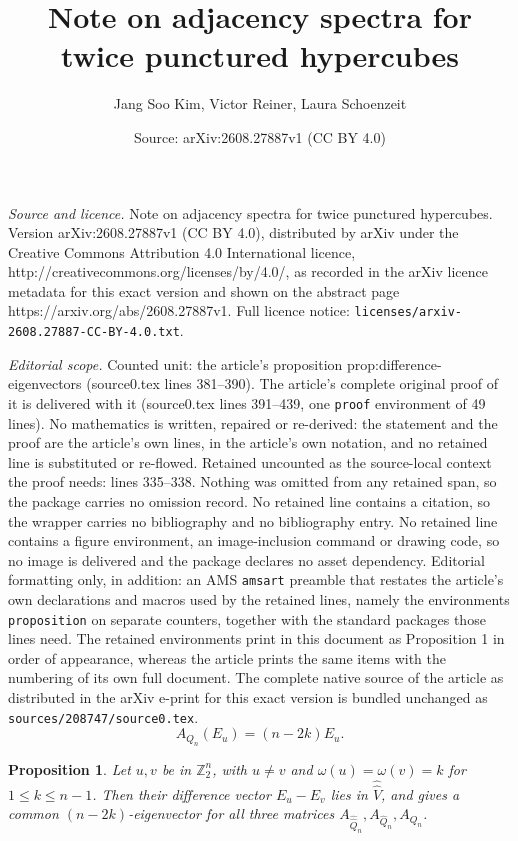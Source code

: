 \documentclass[10pt,a4paper]{amsart}
\title{Note on adjacency spectra for twice punctured hypercubes}
\author{Jang Soo Kim, Victor Reiner, Laura Schoenzeit}
\date{Source: arXiv:2608.27887v1 (CC BY 4.0)}
\newtheorem{proposition}{Proposition}
\newcommand{\ZZ}{\mathbb{Z}}
\begin{document}
\maketitle

\noindent\emph{Source and licence.} Note on adjacency spectra for twice punctured hypercubes. Version arXiv:2608.27887v1 (CC BY 4.0), distributed by arXiv under the Creative Commons Attribution 4.0 International licence, http://creativecommons.org/licenses/by/4.0/, as recorded in the arXiv licence metadata for this exact version and shown on the abstract page https://arxiv.org/abs/2608.27887v1. Full licence notice: \texttt{licenses/arxiv-2608.27887-CC-BY-4.0.txt}.\par\smallskip

\noindent\textit{Editorial scope.} Counted unit: the article's proposition prop:difference-eigenvectors (source0.tex lines 381--390). The article's complete original proof of it is delivered with it (source0.tex lines 391--439, one \texttt{proof} environment of 49 lines). No mathematics is written, repaired or re-derived: the statement and the proof are the article's own lines, in the article's own notation, and no retained line is substituted or re-flowed.  Retained uncounted as the source-local context the proof needs: lines 335--338.  Nothing was omitted from any retained span, so the package carries no omission record.  No retained line contains a citation, so the wrapper carries no bibliography and no bibliography entry.  No retained line contains a figure environment, an image-inclusion command or drawing code, so no image is delivered and the package declares no asset dependency.  Editorial formatting only, in addition: an AMS \texttt{amsart} preamble that restates the article's own declarations and macros used by the retained lines, namely the environments \texttt{proposition} on separate counters, together with the standard packages those lines need.  The retained environments print in this document as Proposition 1 in order of appearance, whereas the article prints the same items with the numbering of its own full document.  The complete native source of the article as distributed in the arXiv e-print for this exact version is bundled unchanged as \texttt{sources/208747/source0.tex}.
\begin{equation}
\label{eqn:eigenvector-equation-for-Eu}
A_{Q_n}(E_u)=(n-2k) E_u.
\end{equation}

\begin{proposition}
\label{prop:difference-eigenvectors}
Let $u,v$ be in $\ZZ_2^n$, 
with $u \neq v$ and $\omega(u)=\omega(v)=k$ for $1 \leq k \leq n-1$.
Then their difference vector $E_u-E_v$
lies in $\hat{\hat{V}}$,
and gives a common $(n-2k)$-eigenvector
for all three matrices $A_{\hat{\hat{Q}}_n}, A_{\hat{Q}_n}, A_{Q_n}$.

\end{proposition}
\end{document}

